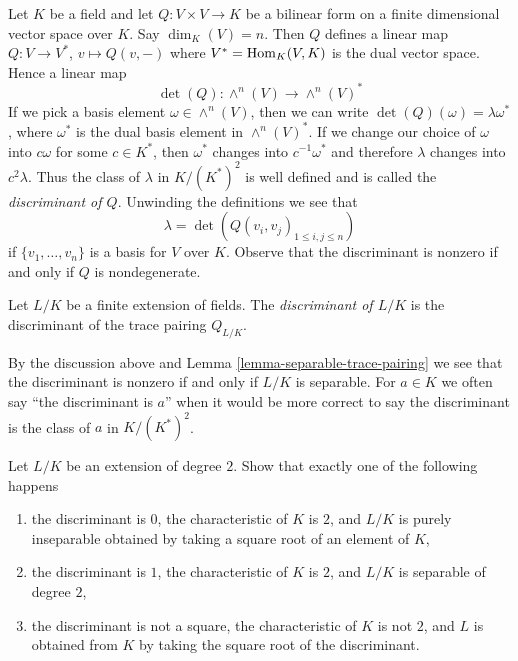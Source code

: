 \noindent
Let $K$ be a field and let $Q : V \times V \to K$ be a bilinear form
on a finite dimensional vector space over $K$. Say $\dim_K(V) = n$.
Then $Q$ defines a linear map $Q : V \to V^*$, $v \mapsto Q(v, -)$
where $V^* = \mathop{\mathrm{Hom}}\nolimits_K(V, K)$ is the dual vector space. Hence a linear map
$$
\det(Q) : \wedge^n(V) \longrightarrow \wedge^n(V)^*
$$
If we pick a basis element $\omega \in \wedge^n(V)$, then we can
write $\det(Q)(\omega) = \lambda \omega^*$, where $\omega^*$
is the dual basis element in $\wedge^n(V)^*$. If we change our
choice of $\omega$ into $c \omega$ for some $c \in K^*$, then
$\omega^*$ changes into $c^{-1} \omega^*$ and therefore
$\lambda$ changes into $c^2 \lambda$. Thus the class of
$\lambda$ in $K/(K^*)^2$ is well defined and is called the
{\it discriminant of $Q$}. Unwinding the definitions we see that
$$
\lambda = \det(Q(v_i, v_j)_{1 \leq i, j \leq n})
$$
if $\{v_1, \ldots, v_n\}$ is a basis for $V$ over $K$. Observe that
the discriminant is nonzero if and only if $Q$ is nondegenerate.

\begin{definition}
\label{definition-discriminant}
Let $L/K$ be a finite extension of fields. The
{\it discriminant of $L/K$} is the discriminant of
the trace pairing $Q_{L/K}$.
\end{definition}

\noindent
By the discussion above and Lemma \ref{lemma-separable-trace-pairing}
we see that the discriminant is nonzero if and only
if $L/K$ is separable. For $a \in K$ we often say
``the discriminant is $a$'' when it would be more correct
to say the discriminant is the class of $a$ in $K/(K^*)^2$.

\begin{exercise}
\label{exercise-quadratic-discriminant}
Let $L/K$ be an extension of degree $2$. Show that exactly
one of the following happens
\begin{enumerate}
\item the discriminant is $0$, the characteristic of $K$ is $2$,
and $L/K$ is purely inseparable obtained by taking a square root
of an element of $K$,
\item the discriminant is $1$, the characteristic of $K$ is $2$, and
$L/K$ is separable of degree $2$,
\item the discriminant is not a square, the characteristic of $K$
is not $2$, and $L$ is obtained from $K$ by taking the square root
of the discriminant.
\end{enumerate}
\end{exercise}











